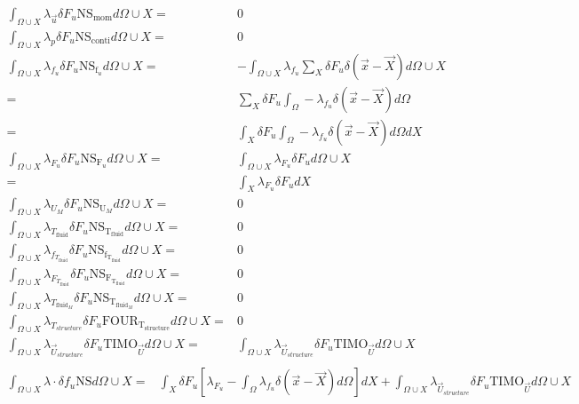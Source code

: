 \documentclass[10pt]{article} %
\begin{document}
\begin{center}
\begin{align*}
	\int_{\Omega \cup X} \lambda_{\vec{u}} \delta F_u \text{NS}_{\text{mom}} d\Omega \cup X =& 0\\
	\int_{\Omega \cup X} \lambda_p \delta F_u \text{NS}_{\text{conti}} d\Omega \cup X =& 0\\
	\int_{\Omega \cup X} \lambda_{f_u} \delta F_u \text{NS}_{\text{f}_u} d\Omega \cup X 
	=& -\int_{\Omega \cup X} \lambda_{f_u} \sum_X \delta F_u \delta (\vec{x}-\vec{X}) d\Omega \cup X\\
	=& \sum_X \delta F_u \int_{\Omega} -\lambda_{f_u} \delta (\vec{x}-\vec{X}) d\Omega\\
	=& \int_X \delta F_u \int_{\Omega} -\lambda_{f_u} \delta (\vec{x}-\vec{X}) d\Omega dX\\
	\int_{\Omega \cup X} \lambda_{F_u} \delta F_u \text{NS}_{\text{F}_u} d\Omega \cup X 
	=& \int_{\Omega \cup X} \lambda_{F_u} \delta F_u d\Omega \cup X\\
	=& \int_{X} \lambda_{F_u} \delta F_u d X\\
	\int_{\Omega \cup X} \lambda_{U_M} \delta F_u \text{NS}_{\text{U}_M} d\Omega \cup X =& 0\\
	\int_{\Omega \cup X} \lambda_{T_{\text{fluid}}} \delta F_u \text{NS}_{\text{T}_{\text{fluid}}} d\Omega \cup X =&	0\\
	\int_{\Omega \cup X} \lambda_{f_{T_{\text{fluid}}}} \delta F_u \text{NS}_{\text{f}_{\text{T}_{\text{fluid}}}} d\Omega \cup X =& 0\\
	\int_{\Omega \cup X} \lambda_{F_{T_{\text{fluid}}}} \delta F_u \text{NS}_{\text{F}_{\text{T}_{\text{fluid}}}} d\Omega \cup X =& 0\\
	\int_{\Omega \cup X} \lambda_{T_{\text{fluid}_M}} \delta F_u \text{NS}_{\text{T}_{\text{fluid}_M}} d\Omega \cup X =& 0\\
	\int_{\Omega \cup X} \lambda_{T_{structure}} \delta F_u \text{FOUR}_{\text{T}_{\text{structure}}} d\Omega \cup X =& 0\\
	\int_{\Omega \cup X} \lambda_{\vec{U}_{structure}} \delta F_u \text{TIMO}_{\vec{U}} d\Omega \cup X =& \int_{\Omega \cup X} \lambda_{\vec{U}_{structure}} \delta F_u \text{TIMO}_{\vec{U}} d\Omega \cup X\\
\end{align*}
\begin{align*}
	\int_{\Omega \cup X} \lambda \cdot \delta f_u \text{NS}d\Omega \cup X 
	=&\int_{X} \delta F_u \left[ \lambda_{F_u} - \int_{\Omega} \lambda_{f_u} \delta (\vec{x}-\vec{X}) d\Omega\right] d X + \int_{\Omega \cup X} \lambda_{\vec{U}_{structure}} \delta F_u \text{TIMO}_{\vec{U}} d\Omega \cup X\\

\end{align*}
\end{center}
\end{document}
